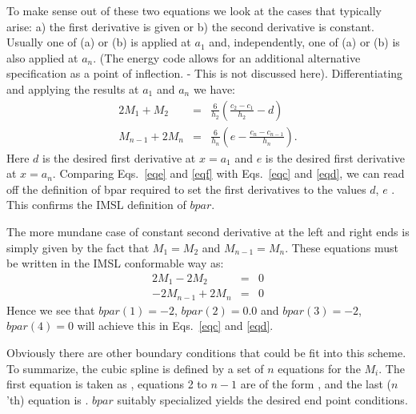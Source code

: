 To make sense out of these two equations we look at the  cases that typically
arise: a) the first derivative is given  or b) the second derivative is
constant. Usually one of (a) or (b) is applied at $a_1 $ and, independently, one
of (a) or (b)  is also applied at $a_n$. (The energy code allows for an
additional alternative specification as a point of inflection. - This is not
discussed here). Differentiating  and applying the results at $a_1 $
and $a_n$ we have:
\begin{eqnarray}
 2M_1 +M_2 & = & \frac{6}{h_2}\left(\frac{c_2-c_1}{h_2} - d \right) 
 \label{eqe}\\ 
 M_{n-1} + 2M_n & = & \frac{6}{h_n}\left(e - \frac{c_n
 -c_{n-1}}{h_n} \right) \label{eqf}.
\end{eqnarray}
Here $d$ is the desired first derivative at $x = a_1 $ and $e$ is the desired
first derivative at $x= a_n $. Comparing Eqs.~\eqref{eqe} and \eqref{eqf} with
Eqs.~\ref{eqc} and \ref{eqd},  we can read off the definition of bpar required
to set the first derivatives to the values $d$, $e$ . This confirms  the IMSL
definition of $bpar$. 

The more mundane case of constant second derivative at the
left and right ends is simply given by the fact that $ M_1 = M_2 $ and
$  M_{n-1} = M_n $. These equations must be written in the
IMSL conformable way as:
\begin{eqnarray}
 2M_1 -  2 M_2 & = &  0  \label{eqg} \\
 - 2 M_{n-1} + 2M_n & = & 0   \label{eqh}
\end{eqnarray}
Hence we see that $bpar(1) = -2$, $bpar(2) =0.0$ and
$bpar(3) = -2$, $bpar(4) =0$ will achieve this in
Eqs.~\eqref{eqc} and \eqref{eqd}.

Obviously there are other boundary conditions that could be fit
into this scheme. To summarize, the cubic spline is defined by
a set of $n$ equations for the $M_i $. The first equation is
taken as , equations 2 to $n-1$ are of the form
, and the last ($n$'th) equation is .
$bpar$ suitably specialized yields the desired end point
conditions.

